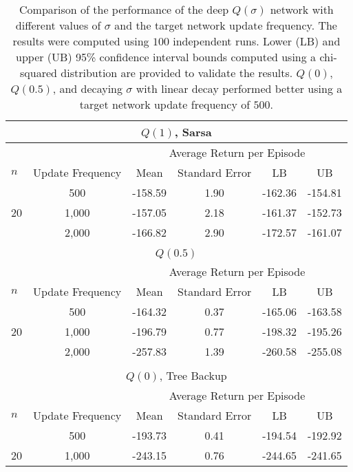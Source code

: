 \begin{table}[htp] 
\caption[Comparison of the Performance of the Deep $Q(\sigma)$ Network with Different Values of $\sigma$ and the Target Network Update Frequency]{Comparison of the performance of the deep $Q(\sigma)$ network with different values of $\sigma$ and the target network update frequency.
The results were computed using $100$ independent runs.
Lower (LB) and upper (UB) 95\% confidence interval bounds computed using a chi-squared distribution are provided to validate the results.
$Q(0)$, $Q(0.5)$, and decaying $\sigma$ with linear decay performed better using a target network update frequency of $500$.
}
\label{tbl:different_tnetwork_ufreq}
\begin{center}
\begin{tabular}{lccccc}
\toprule
\multicolumn{6}{c}{$Q(1)$, Sarsa} \\
\bottomrule
&& \multicolumn{4}{c}{Average Return per Episode} \\
\cmidrule{3-6}
$n$ & Update Frequency & Mean & Standard Error & LB & UB \\
\midrule
    & 500       & -158.59	& 1.90	& -162.36	& -154.81   \\
20  & 1,000     & -157.05	& 2.18	& -161.37	& -152.73   \\
    & 2,000     & -166.82	& 2.90	& -172.57	& -161.07   \\
\bottomrule
&&&& \\
\toprule
\multicolumn{6}{c}{$Q(0.5)$} \\
\bottomrule
&& \multicolumn{4}{c}{Average Return per Episode} \\
\cmidrule{3-6}
$n$ & Update Frequency & Mean & Standard Error & LB & UB \\
\midrule
    & 500       & -164.32	& 0.37	& -165.06	& -163.58   \\
20  & 1,000     & -196.79	& 0.77	& -198.32	& -195.26   \\
    & 2,000     & -257.83	& 1.39	& -260.58	& -255.08   \\
\bottomrule
&&&& \\
\toprule
\multicolumn{6}{c}{$Q(0)$, Tree Backup} \\
\bottomrule
&& \multicolumn{4}{c}{Average Return per Episode} \\
\cmidrule{3-6}
$n$ & Update Frequency & Mean & Standard Error & LB & UB \\
\midrule
    & 500       & -193.73	& 0.41	& -194.54	& -192.92   \\
20  & 1,000     & -243.15	& 0.76	& -244.65	& -241.65   \\

\end{tabular}
\end{center}
\end{table}
